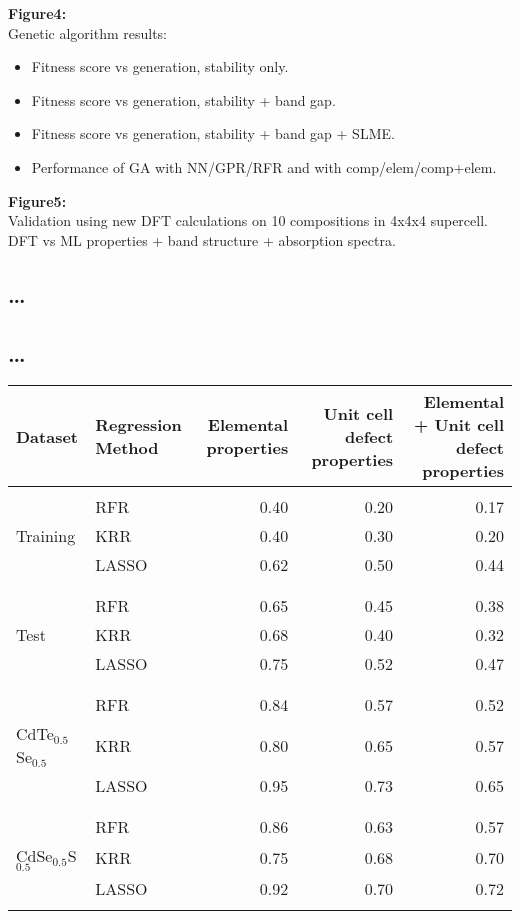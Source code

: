 \documentclass[preprint]{revtex4-2}
\begin{document}
\textbf{Figure4:}\\
Genetic algorithm results:

\begin{itemize}
\item Fitness score vs generation, stability only.

\item Fitness score vs generation, stability + band gap.

\item Fitness score vs generation, stability + band gap + SLME.

\item Performance of GA with NN/GPR/RFR and with comp/elem/comp+elem.\\
\end{itemize}

\textbf{Figure5:}\\
Validation using new DFT calculations on 10 compositions in 4x4x4
supercell. DFT vs ML properties + band structure + absorption spectra.\\

\subsection*{\ldots{}}
\label{sec:orgbe703e2}
\subsection*{\ldots{}}
\label{sec:org111386a}
\begin{center}
\begin{tabular}{llrrr}
\textbf{Dataset} & \textbf{Regression Method} & \textbf{Elemental properties} & \textbf{Unit cell defect properties} & \textbf{Elemental + Unit cell defect properties}\\
\hline
 &  &  &  & \\
 & RFR & 0.40 & 0.20 & 0.17\\
Training & KRR & 0.40 & 0.30 & 0.20\\
 & LASSO & 0.62 & 0.50 & 0.44\\
 &  &  &  & \\
 &  &  &  & \\
 & RFR & 0.65 & 0.45 & 0.38\\
Test & KRR & 0.68 & 0.40 & 0.32\\
 & LASSO & 0.75 & 0.52 & 0.47\\
 &  &  &  & \\
 &  &  &  & \\
 & RFR & 0.84 & 0.57 & 0.52\\
CdTe\(_{0.5}\)Se\(_{0.5}\) & KRR & 0.80 & 0.65 & 0.57\\
 & LASSO & 0.95 & 0.73 & 0.65\\
 &  &  &  & \\
 &  &  &  & \\
 & RFR & 0.86 & 0.63 & 0.57\\
CdSe\(_{0.5}\)S\(_{0.5}\) & KRR & 0.75 & 0.68 & 0.70\\
 & LASSO & 0.92 & 0.70 & 0.72\\
 &  &  &  & \\
\end{tabular}
\end{center}
\end{document}
